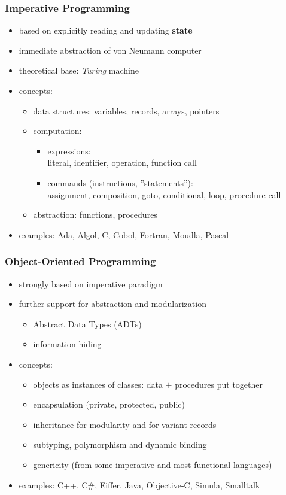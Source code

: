 \begin{multicols}{2}
\subsubsection{Imperative Programming}
\begin{itemize}
  \item based on explicitly reading and updating \textbf{state}
  \item immediate abstraction of von Neumann computer
  \item theoretical base: \textit{Turing} machine
  \item concepts:
  \begin{itemize}
    \item data structures: variables, records, arrays, pointers
    \item computation:
    \begin{itemize}
      \item expressions:\\
      literal, identifier, operation, function call
      \item commands (instructions, ''statements''):\\
      assignment, composition, goto, conditional, loop, procedure call
    \end{itemize}
    \item abstraction: functions, procedures
  \end{itemize}
  \item examples: Ada, Algol, C, Cobol, Fortran, Moudla, Pascal
\end{itemize}

\subsubsection{Object-Oriented Programming}
\begin{itemize}
  \item strongly based on imperative paradigm
  \item further support for abstraction and modularization
  \begin{itemize}
    \item Abstract Data Types (ADTs)
    \item information hiding
  \end{itemize}
  \item concepts:
  \begin{itemize}
    \item objects as instances of classes: data $+$ procedures put together
    \item encapsulation (private, protected, public)
    \item inheritance for modularity and for variant records
    \item subtyping, polymorphism and dynamic binding
    \item genericity (from some imperative and most functional languages)
  \end{itemize}
  \item examples: C++, C\#, Eiffer, Java, Objective-C, Simula, Smalltalk
\end{itemize}


\end{multicols}
